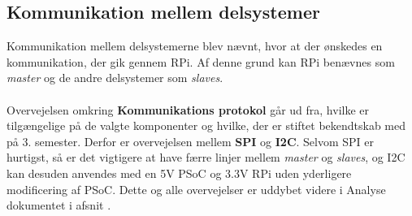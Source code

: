 \documentclass[Rapport/Rapport_main.tex]{subfiles}
\begin{document}
\subsection{Kommunikation mellem delsystemer}
Kommunikation mellem delsystemerne blev nævnt, hvor at der ønskedes en kommunikation, der gik gennem RPi. Af denne grund kan RPi benævnes som \textit{master} og de andre delsystemer som \textit{slaves}.\\\\
Overvejelsen omkring \textbf{Kommunikations protokol} går ud fra, hvilke er tilgængelige på de valgte komponenter og hvilke, der er stiftet bekendtskab med på 3. semester. Derfor er overvejelsen mellem \textbf{SPI} og \textbf{I2C}. Selvom SPI er hurtigst, så er det vigtigere at have færre linjer mellem \textit{master} og \textit{slaves}, og I2C kan desuden anvendes med en 5V PSoC og 3.3V RPi uden yderligere modificering af PSoC. Dette og alle overvejelser er uddybet videre i Analyse dokumentet i afsnit .
\end{document}
